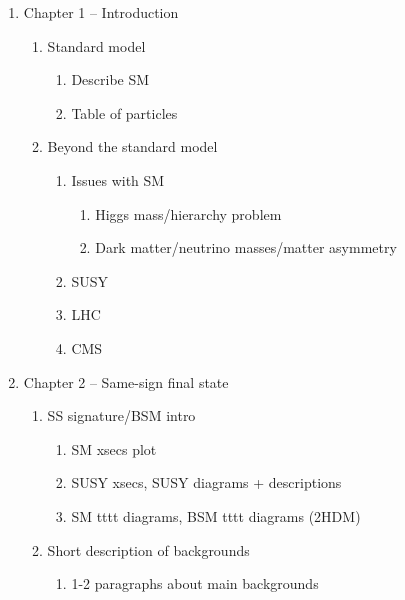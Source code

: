 \begin{enumerate}

	\item Chapter 1 -- Introduction
    \begin{enumerate}
    	\item Standard model
        \begin{enumerate}
            \item Describe SM
            \item Table of particles
        \end{enumerate}
    	\item Beyond the standard model
        \begin{enumerate}
            \item Issues with SM
            \begin{enumerate}
                \item Higgs mass/hierarchy problem
                \item Dark matter/neutrino masses/matter asymmetry
            \end{enumerate}
            \item SUSY
            \item LHC
            \item CMS
        \end{enumerate}
    \end{enumerate}

	\item Chapter 2 -- Same-sign final state
    \begin{enumerate}
    	\item SS signature/BSM intro
        \begin{enumerate}
            \item SM xsecs plot
            \item SUSY xsecs, SUSY diagrams + descriptions
            \item SM tttt diagrams, BSM tttt diagrams (2HDM)
        \end{enumerate}
    	\item Short description of backgrounds
        \begin{enumerate}
            \item 1-2 paragraphs about main backgrounds
        \end{enumerate}
    \end{enumerate}


\end{enumerate}
